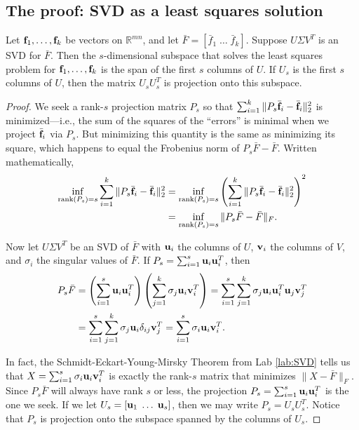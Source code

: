 \subsection*{The proof: SVD as a least squares solution}
\begin{theorem}
Let ${\bf f}_1, \ldots, {\bf f}_k$ be vectors on $\mathbb{R}^{mn}$, and let $\bar{F} = [\bar{f}_1 \; \ldots \; \bar{f}_k]$. Suppose $U\Sigma V^T$ is an SVD for $\bar{F}$. Then the $s$-dimensional subspace that solves the least squares problem for ${\bf f}_1, \ldots, {\bf f}_k$ is the span of the first $s$ columns of $U$. If $U_s$ is the first $s$ columns of $U$, then the matrix $U_sU_s^T$ is projection onto this subspace.
\end{theorem}
\begin{proof}
We seek a rank-$s$ projection matrix $P_s$ so that $\sum_{i=1}^k \|P_s\bar{{\bf f}}_i - \bar{{\bf f}}_i\|_2^2$ is minimized---i.e.,
 the sum of the squares of the ``errors'' is minimal when we project $\bar{{\bf f}}_i$ via $P_s$.
 But minimizing this quantity is the same as minimizing its square, which happens to equal the Frobenius norm of $P_s\bar{F} - \bar{F}$. 
Written mathematically,
 \begin{align*}
\inf_{\text{rank}(P_s)=s} \sum_{i=1}^k \|P_s\bar{{\bf f}}_i - \bar{{\bf f}}_i\|_2^2 &=  \inf_{\text{rank}(P_s)=s} \left( \sum_{i=1}^k \|P_s\bar{{\bf f}}_i - \bar{{\bf f}}_i\|_2^2 \right) ^2\\
 & =  \inf_{\text{rank}(P_s)=s} \| P_s\bar{F}-\bar{F}\|_F.
 \end{align*}
 
Now let $U \Sigma V^T$ be an SVD of $\bar{F}$ with ${\bf u}_i$ the columns of $U$, ${\bf v}_i$ the columns of $V$, and $\sigma_i$ the singular values of $\bar{F}$.
If $P_s = \sum_{i=1}^s {\bf u}_i {\bf u}_i^T$, then 
\begin{align*}
P_s\bar{F} &=  \left( \sum_{i=1}^s {\bf u}_i {\bf u}_i^T \right)\left(  \sum_{j=1}^k \sigma_j {\bf u}_i {\bf v}_i^T \right)
= \sum_{i=1}^s\sum_{j=1}^k \sigma_j {\bf u}_i{\bf u}_i^T{\bf u}_j{\bf v}_j^T\\
&=  \sum_{i=1}^s\sum_{j=1}^k \sigma_j {\bf u}_i\delta_{ij}{\bf v}_j^T
= \sum_{i=1}^s \sigma_i {\bf u}_i{\bf v}_i^T.
\end{align*}

In fact, the Schmidt-Eckart-Young-Mirsky Theorem from Lab \ref{lab:SVD} tells us that $X = \sum_{i=1}^s \sigma_i {\bf u}_i{\bf v}_i^T$ is exactly the rank-$s$ matrix that minimizes $\|X - \bar{F}\|_F$. 
Since $P_s \bar{F}$ will always have rank $s$ or less, the projection $P_s =  \sum_{i=1}^s {\bf u}_i {\bf u}_i^T$ is the one we seek.
If we let $U_s = [ {\bf u}_1\; \ldots \; {\bf u}_s]$, then we may write $P_s = U_sU_s^T$. Notice that $P_s$ is projection onto the subspace spanned by the columns of $U_s$.
\end{proof}

